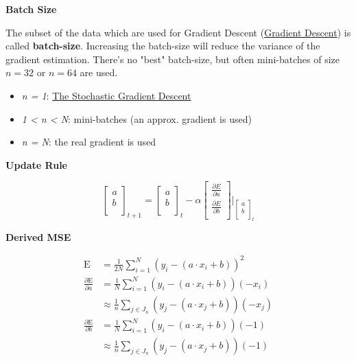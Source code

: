 \documentclass[11pt,twoside,landscape]{article}
\begin{document}
\begin{multicols}{3}
\textbf{Batch Size}

The subset of the data which are used for Gradient Descent (\href{../../../roam/20211208163604-gradient_descent.org}{Gradient Descent}) is called \textbf{batch-size}.
Increasing the batch-size will reduce the variance of the gradient estimation.
There's no "best" batch-size, but often mini-batches of size \(n=32\) or \(n=64\) are used. 

\begin{itemize}
\item \emph{n = 1}: \href{../../../roam/20211208165153-the_stochastic_gradient_descent.org}{The Stochastic Gradient Descent}
\item \emph{1 < n < N}: mini-batches (an approx. gradient is used)
\item \emph{n = N}: the real gradient is used
\end{itemize}

\textbf{Update Rule}

\begin{equation}
  \begin{bmatrix}
    a \\
    b \\
  \end{bmatrix}_{t+1} 
  =    \begin{bmatrix}
    a \\
    b \\
  \end{bmatrix}_{t} - \alpha 
  \begin{bmatrix}
    \frac{\partial E}{\partial a} \\
    \frac{\partial E}{\partial b} \\
  \end{bmatrix} \Big\rvert _{\begin{bmatrix}
      a \\
      b \\
    \end{bmatrix}_{t} }
\end{equation}

\textbf{Derived MSE}

\begin{align}
  \textrm{E} &= \frac{1}{2N} \sum_{i=1}^{N} (y_i - (a \cdot x_i + b))^2 \\
  \frac{\partial \textrm{E}}{\partial a} &= \frac{1}{N} \sum_{i=1}^{N} (y_i - (a \cdot x_i + b)) (-x_i) \\
  &\approx \frac{1}{n} \sum_{j \in J_n} (y_j - (a \cdot x_j + b)) (-x_j)  \\
  \frac{\partial \textrm{E}}{\partial b} &= \frac{1}{N} \sum_{i=1}^{N} (y_i - (a \cdot x_i + b)) (-1) \\
  &\approx \frac{1}{n} \sum_{j \in J_n} (y_{j} - (a \cdot x_{j} + b)) (-1)  \\
\end{align}



\end{multicols}
\end{document}
